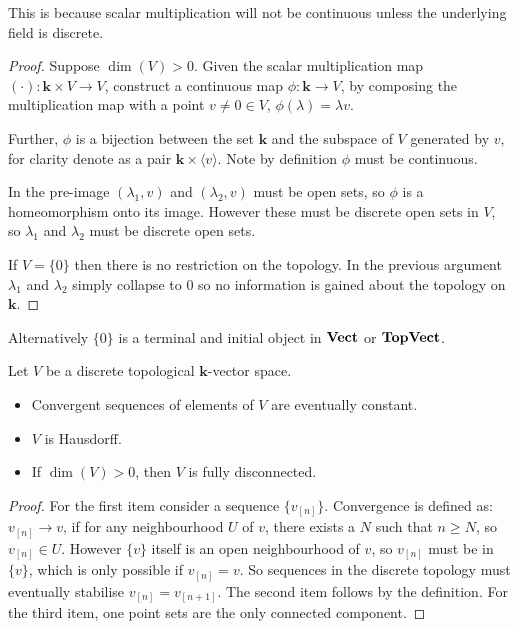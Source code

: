         This is because scalar multiplication will not be continuous unless the underlying field is discrete.
        
        \begin{proof}
        Suppose \( \dim(V) > 0\).
        Given the scalar multiplication map \( (\cdot) : \mathbf{k} \times V \rightarrow V\), construct a continuous map \( \phi : \mathbf{k} \rightarrow V \), by composing the multiplication map with a point \(v \neq 0 \in V\), \( \phi(\lambda) = \lambda v  \). 
        
        Further, \(\phi \) is a bijection between the set \(\mathbf{k}\) and the subspace of \(V\) generated by \(v\), for clarity denote as a pair \( \mathbf{k} \times \langle v\rangle \). Note by definition \( \phi\) must be continuous. 
        
        
        In the pre-image \( (\lambda_1, v)\) and \((\lambda_2, v)\) must be open sets, so \( \phi\) is a homeomorphism onto its image. However these must be discrete open sets in \(V\), so \( \lambda_1 \) and \( \lambda_2\) must be discrete open sets.
        
        If \( V = \{ 0\} \) then there is no restriction on the topology. In the previous argument \( \lambda_1 \) and \( \lambda_2\) simply collapse to \(0\) so no information is gained about the topology on \( \mathbf{k}\).
        \end{proof}
        
        
        
        Alternatively \( \{0\}\) is a terminal and initial object in \( \mathbf{Vect}\) or \( \mathbf{TopVect}\). 

        \begin{lem} 
        Let \(V\) be a  discrete topological \( \mathbf{k}\)-vector space. 
        \begin{itemize}
            \item Convergent sequences of elements of \(V\) are eventually constant. 
            \item \(V\) is Hausdorff.
            \item If \( \dim(V) > 0\), then \(V\) is fully disconnected.
        \end{itemize}
        \end{lem}
        
        \begin{proof}
        For the first item consider a sequence \( \{v_{[n]}\}\).  Convergence is defined as: \(v_{[n]} \rightarrow v\), if for any neighbourhood \(U\) of \(v\), there exists a \( N\) such that \( n \geq N\), so \(v_{[n]} \in U\). However \(\{v\}\) itself is an open neighbourhood of \(v\), so \( v_{[n]}\) must be in \(\{ v\}\), which is only possible if \( v_{[n]} = v\). So sequences in the discrete topology must eventually stabilise \(v_{[n]} = v_{[n+1]}\). The second item follows by the definition. For the third item, one point sets are the only connected component.
        \end{proof}
    
